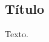 

\begin{apendicesenv}
	\renewcommand{\thechapter}{\arabic{chapter}}
	\partapendices
	\chapter{Título} \label{ap:ap01}
	
	Texto.
	
\end{apendicesenv}



